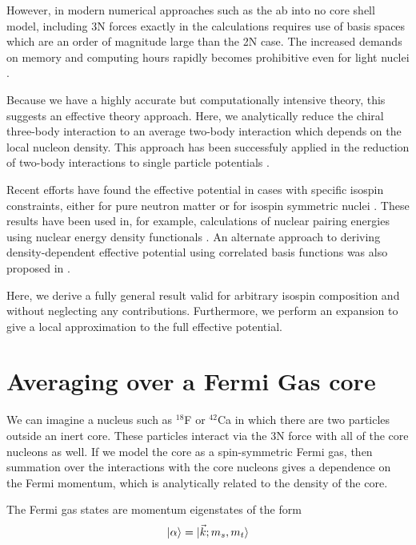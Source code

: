 \documentclass[%
 preprint,
 amsmath,amssymb,
 aps,
]{revtex4-1}
\begin{document}
However, in modern numerical approaches such as the ab into no core shell model, including 3N forces exactly in the calculations requires use of basis spaces which are an order of magnitude large than the 2N case. The increased demands on memory and computing hours  rapidly becomes prohibitive even for light nuclei \cite{Barrett2013131}. 

Because we have a highly accurate but computationally intensive theory, this suggests an effective theory approach. Here, we analytically reduce the chiral three-body interaction to an average two-body interaction which depends on the local nucleon density. This approach has been successfuly applied in the reduction of two-body interactions to single particle potentials \cite{PhysRev.133.B329,AdelbergerHaxton}.

Recent efforts have found the effective potential in cases with specific isospin constraints, either for pure neutron matter \cite{PhysRevC.82.014314} or for isospin symmetric nuclei \cite{PhysRevC.81.024002}. These results have been used in, for example, calculations of nuclear pairing energies using nuclear energy density functionals \cite{0954-3899-39-1-015108}. An alternate approach to deriving density-dependent effective potential using correlated basis functions was also proposed in \cite{PhysRevC.83.054003}.

Here, we derive a fully general result valid for arbitrary isospin composition and without neglecting any contributions. Furthermore, we perform an expansion to give a local approximation to the full effective potential.

\section{Averaging over a Fermi Gas core}

We can imagine a nucleus such as $^{18}$F or $^{42}$Ca in which there are two particles outside an inert core. These particles interact via the 3N force with all of the core nucleons as well. If we model the core as a spin-symmetric Fermi gas, then summation over the interactions with the core nucleons gives a dependence on the Fermi momentum, which is analytically related to the density of the core. 

The Fermi gas states are momentum eigenstates of the form
\begin{equation}
\ket{\alpha}=\ket{\vec{k};m_s,m_t}
\end{equation}
\end{document}

